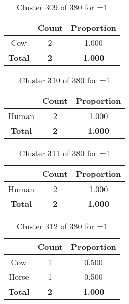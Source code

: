 \begin{table}[ht!]
\centering
\begin{tabular}{|c|c|c|}
\hline
\bf \Spec{} &\bf Count &\bf Proportion\\ \hline \hline
Cow & 2 & 1.000\\ \hline
\hline
\bf Total & \bf 2 & \bf 1.000\\ \hline
\end{tabular}
\label{tab:cluster:309:1}
\caption{Cluster 309 of 380 for \minneigh{}=1}
\end{table}

\clearpage
\begin{table}[ht!]
\centering
\begin{tabular}{|c|c|c|}
\hline
\bf \Spec{} &\bf Count &\bf Proportion\\ \hline \hline
Human & 2 & 1.000\\ \hline
\hline
\bf Total & \bf 2 & \bf 1.000\\ \hline
\end{tabular}
\label{tab:cluster:310:1}
\caption{Cluster 310 of 380 for \minneigh{}=1}
\end{table}

\begin{table}[ht!]
\centering
\begin{tabular}{|c|c|c|}
\hline
\bf \Spec{} &\bf Count &\bf Proportion\\ \hline \hline
Human & 2 & 1.000\\ \hline
\hline
\bf Total & \bf 2 & \bf 1.000\\ \hline
\end{tabular}
\label{tab:cluster:311:1}
\caption{Cluster 311 of 380 for \minneigh{}=1}
\end{table}

\begin{table}[ht!]
\centering
\begin{tabular}{|c|c|c|}
\hline
\bf \Spec{} &\bf Count &\bf Proportion\\ \hline \hline
Cow & 1 & 0.500\\ \hline
Horse & 1 & 0.500\\ \hline
\hline
\bf Total & \bf 2 & \bf 1.000\\ \hline
\end{tabular}
\label{tab:cluster:312:1}
\caption{Cluster 312 of 380 for \minneigh{}=1}
\end{table}

